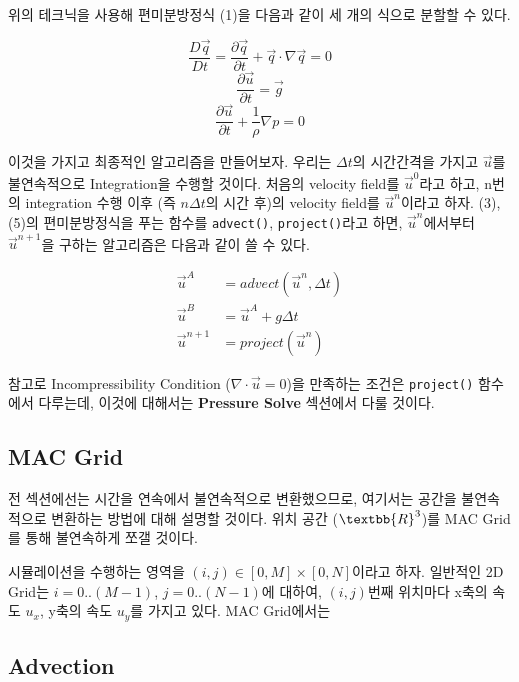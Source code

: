 \documentclass[12pt, A4]{article}
\begin{document}
위의 테크닉을 사용해 편미분방정식 (1)을 다음과 같이 세 개의 식으로 분할할 수 있다.

\begin{equation}
  \frac{D\vec{q}}{Dt} = \frac{\partial \vec{q}}{\partial t} + \vec{q} \cdot \nabla \vec{q} = 0
\end{equation}
\begin{equation}
  \frac{\partial \vec{u}}{\partial t} = \vec{g}
\end{equation}
\begin{equation}
  \frac{\partial \vec{u}}{\partial t} + \frac{1}{\rho} \nabla p = 0
\end{equation}

이것을 가지고 최종적인 알고리즘을 만들어보자.
우리는 $\Delta t$의 시간간격을 가지고 $\vec{u}$를 불연속적으로 Integration을 수행할 것이다. 처음의 velocity field를 $\vec{u}^0$라고 하고, n번의 integration 수행 이후 (즉 $n \Delta t$의 시간 후)의 velocity field를 $\vec{u}^n$이라고 하자. (3), (5)의 편미분방정식을 푸는 함수를 \texttt{advect()}, \texttt{project()}라고 하면, $\vec{u}^n$에서부터 $\vec{u}^{n+1}$을 구하는 알고리즘은 다음과 같이 쓸 수 있다.

\begin{align*}
  \vec{u}^A &= advect(\vec{u}^n, \Delta t) \\
  \vec{u}^B &= \vec{u}^A + g \Delta t \\
  \vec{u}^{n+1} &= project(\vec{u}^{n})
\end{align*}

참고로 Incompressibility Condition ($\nabla \cdot \vec{u} = 0$)을 만족하는 조건은 \texttt{project()} 함수에서 다루는데, 이것에 대해서는 \textbf{Pressure Solve} 섹션에서 다룰 것이다.

\subsection{MAC Grid}

전 섹션에선는 시간을 연속에서 불연속적으로 변환했으므로, 여기서는 공간을 불연속적으로 변환하는 방법에 대해 설명할 것이다. 위치 공간 ($\textbb{R}^3$)를 MAC Grid를 통해 불연속하게 쪼갤 것이다.

시뮬레이션을 수행하는 영역을 $(i, j) \in [0, M] \times [0, N]$이라고 하자. 일반적인 2D Grid는 $i = 0..(M-1)$, $j = 0..(N-1)$에 대하여,  $(i, j)$번째 위치마다 x축의 속도 $u_x$, y축의 속도 $u_y$를 가지고 있다. MAC Grid에서는 

\subsection{Advection}
\end{document}
